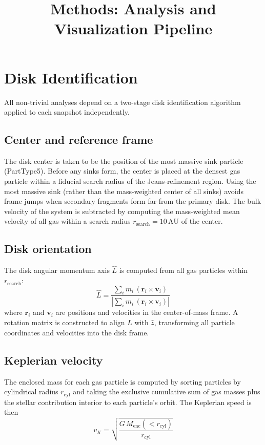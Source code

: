 \documentclass[12pt]{article}
\title{Methods: Analysis and Visualization Pipeline}
\date{}
\begin{document}
\maketitle

\section{Disk Identification}

All non-trivial analyses depend on a two-stage disk identification algorithm
applied to each snapshot independently.

\subsection*{Center and reference frame}

The disk center is taken to be the position of the most massive sink particle
(PartType5). Before any sinks form, the center is placed at the densest gas
particle within a fiducial search radius of the Jeans-refinement region. Using
the most massive sink (rather than the mass-weighted center of all sinks) avoids
frame jumps when secondary fragments form far from the primary disk. The bulk
velocity of the system is subtracted by computing the mass-weighted mean velocity
of all gas within a search radius $r_\mathrm{search} = 10\,\mathrm{AU}$ of the
center.

\subsection*{Disk orientation}

The disk angular momentum axis $\hat{L}$ is computed from all gas particles
within $r_\mathrm{search}$:
\begin{equation}
    \hat{L} = \frac{\sum_i m_i\,(\mathbf{r}_i \times \mathbf{v}_i)}
                   {\left|\sum_i m_i\,(\mathbf{r}_i \times \mathbf{v}_i)\right|}
\end{equation}
where $\mathbf{r}_i$ and $\mathbf{v}_i$ are positions and velocities in the
center-of-mass frame. A rotation matrix is constructed to align $\hat{L}$ with
$\hat{z}$, transforming all particle coordinates and velocities into the disk
frame.

\subsection*{Keplerian velocity}

The enclosed mass for each gas particle is computed by sorting particles by
cylindrical radius $r_\mathrm{cyl}$ and taking the exclusive cumulative sum of
gas masses plus the stellar contribution interior to each particle's orbit. The
Keplerian speed is then
\begin{equation}
    v_K = \sqrt{\frac{G\,M_\mathrm{enc}(<r_\mathrm{cyl})}{r_\mathrm{cyl}}}
\end{equation}
\end{document}
